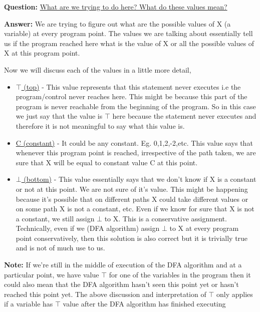 \vspace{0.5cm}

\textbf{Question:} \underline{What are we trying to do here? What do these values mean?}

\vspace{0.3cm}

\textbf{Answer:} We are trying to figure out what are the possible values of X (a variable) at every program point. The values we are talking about essentially tell us if the program reached here what is the value of X or all the possible values of X at this program point.

Now we will discuss each of the values in a little more detail,
\begin{itemize}
    \item \underline{$\top$ (top)} - This value represents that this statement never executes i.e the program/control never reaches here. This might be because this part of the program is never reachable from the beginning of the program. So in this case we just say that the value is $\top$ here because the statement never executes and therefore it is not meaningful to say what this value is.
    \item \underline{C (constant)} - It could be any constant. Eg. 0,1,2,-2,etc. This value says that whenever this program point is reached, irrespective of the path taken, we are sure that X will be equal to constant value C at this point.
    \item \underline{$\bot$ (bottom)} - This value essentially says that we don't know if X is a constant or not at this point. We are not sure of it's value. This might be happening because it's possible that on different paths X could take different values or on some path X is not a constant, etc. Even if we know for sure that X is not a constant, we still assign $\bot$ to X. This is a conservative assignment. Technically, even if we (DFA algorithm) assign $\bot$ to X at every program point conservatively, then this solution is also correct but it is trivially true and is not of much use to us.
\end{itemize}

\textbf{Note:} If we're still in the middle of execution of the DFA algorithm and at a particular point, we have value $\top$ for one of the variables in the program then it could also mean that the DFA algorithm hasn't seen this point yet or hasn't reached this point yet. The above discussion and interpretation of $\top$ only applies if a variable has $\top$ value after the DFA algorithm has finished executing

